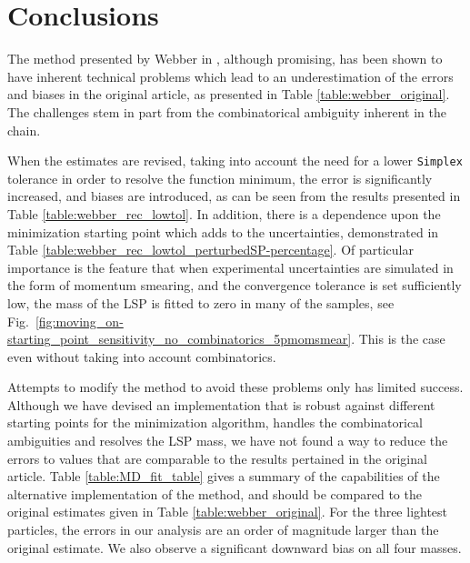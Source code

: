 \documentclass[twoside,english]{uiofysmaster}
\begin{document}












\chapter*{Conclusions} %
The method presented by Webber in \cite{Webber:2009vm}, although promising, has been shown to have inherent technical problems which lead to an underestimation of the errors and biases in the original article, as presented in Table \ref{table:webber_original}. The challenges stem in part from the combinatorical ambiguity inherent in the chain. 

When the estimates are revised, taking into account the need for a lower {\tt Simplex} tolerance in order to resolve the function minimum, the error is significantly increased, and biases are introduced, as can be seen from the results presented in Table \ref{table:webber_rec_lowtol}. In addition, there is a dependence upon the minimization starting point which adds to the uncertainties, demonstrated in Table \ref{table:webber_rec_lowtol_perturbedSP-percentage}. Of particular importance is the feature that when experimental uncertainties are simulated in the form of momentum smearing, and the convergence tolerance is set sufficiently low, the mass of the LSP is fitted to zero in many of the samples, see Fig.\ \ref{fig:moving_on-starting_point_sensitivity_no_combinatorics_5pmomsmear}. This is the case even without taking into account combinatorics.

Attempts to modify the method to avoid these problems only has limited success. Although we have devised an implementation that is robust against different starting points for the minimization algorithm, handles the combinatorical ambiguities and resolves the LSP mass, we have not found a way to reduce the errors to values that are comparable to the results pertained in the original article. Table \ref{table:MD_fit_table} gives a summary of the capabilities of the alternative implementation of the method, and should be compared to the original estimates given in Table \ref{table:webber_original}. For the three lightest particles, the errors in our analysis are an order of magnitude larger than the original estimate. We also observe a significant downward bias on all four masses.
\end{document}
